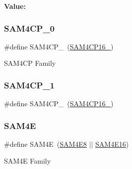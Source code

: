 {\bfseries Value\+:}
\begin{DoxyCode}{0}
\DoxyCodeLine{( \(\backslash\)}
\DoxyCodeLine{        )}

\end{DoxyCode}
\mbox{\label{group__sam__part__macros__group_ga01ca8a083b5d4d9ba3c24c9314f69264}} 
\subsubsection{\texorpdfstring{SAM4CP\_0}{SAM4CP\_0}}
{\footnotesize\ttfamily \#define S\+A\+M4\+C\+P\+\_~(\mbox{\hyperlink{group__sam__part__macros__group_gaa7359e4b343a4ab48894b656b2f349b9}{S\+A\+M4\+C\+P16\+\_}})}

S\+A\+M4\+CP Family \mbox{\label{group__sam__part__macros__group_ga36732239e3e4f8326638b4c159072080}} 
\subsubsection{\texorpdfstring{SAM4CP\_1}{SAM4CP\_1}}
{\footnotesize\ttfamily \#define S\+A\+M4\+C\+P\+\_~(\mbox{\hyperlink{group__sam__part__macros__group_ga6757116bcbffd58eca2b98b620175590}{S\+A\+M4\+C\+P16\+\_}})}

\mbox{\label{group__sam__part__macros__group_ga7266cd2c26bf5ed34a006ed97f34db76}} 
\subsubsection{\texorpdfstring{SAM4E}{SAM4E}}
{\footnotesize\ttfamily \#define S\+A\+M4E~(\mbox{\hyperlink{group__sam__part__macros__group_ga698232ea02e61922d22e02b339796a50}{S\+A\+M4\+E8}} $\vert$$\vert$ \mbox{\hyperlink{group__sam__part__macros__group_ga7e756ab3c18b6c54de1d7f376e13eaa3}{S\+A\+M4\+E16}})}

S\+A\+M4E Family \mbox{\label{group__sam__part__macros__group_ga7e756ab3c18b6c54de1d7f376e13eaa3}} 
